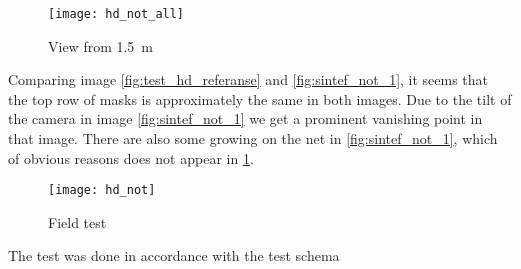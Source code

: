 \begin{figure}[htbp]
	\centering
	\texttt{[image: hd\_not\_all]}
	\caption{View from \SI{1.5}{\metre}}
	\label{fig:test_hd_referanse}
\end{figure}

Comparing image \vref{fig:test_hd_referanse} and \vref{fig:sintef_not_1}, it seems that the 
top row of masks is approximately the same in both images. Due to the tilt of the 
camera in image \ref{fig:sintef_not_1} we get a prominent vanishing point in that image. There 
are also some growing on the net in \ref{fig:sintef_not_1}, which of obvious reasons does not appear 
in \ref{fig:test_hd_referanse}.

\begin{figure}[htbp]
	\centering
	\texttt{[image: hd\_not]}
	\caption{Field test}
	\label{fig:test_hd_clip}
\end{figure}

The test was done in accordance with the test schema